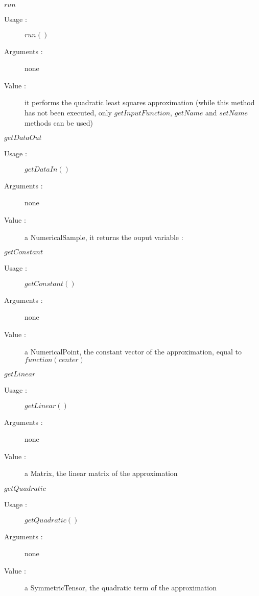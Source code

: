 \begin{description}
\begin{description}
  \item $run$
    \begin{description}
    \item[Usage :] $run()$
    \item[Arguments :] none
    \item[Value :] it performs the quadratic least squares approximation
      (while this method has not been executed, only
      $getInputFunction$, $getName$ and $setName$ methods can be used)
    \end{description}
    \bigskip

  \item $getDataOut$
    \begin{description}
    \item[Usage :] $getDataIn()$
    \item[Arguments :] none
    \item[Value :] a NumericalSample, it returns the ouput variable :
    \end{description}
    \bigskip

  \item $getConstant$
    \begin{description}
    \item[Usage :] $getConstant()$
    \item[Arguments :] none
    \item[Value :] a NumericalPoint, the constant vector of the approximation, equal to $function(center)$
    \end{description}
    \bigskip

  \item $getLinear$
    \begin{description}
    \item[Usage :] $getLinear()$
    \item[Arguments :] none
    \item[Value :] a Matrix, the linear matrix of the approximation
    \end{description}
    \bigskip


  \item $getQuadratic$
    \begin{description}
    \item[Usage :] $getQuadratic()$
    \item[Arguments :] none
    \item[Value :] a SymmetricTensor, the quadratic term of the approximation
    \end{description}


\end{description}
\end{description}
